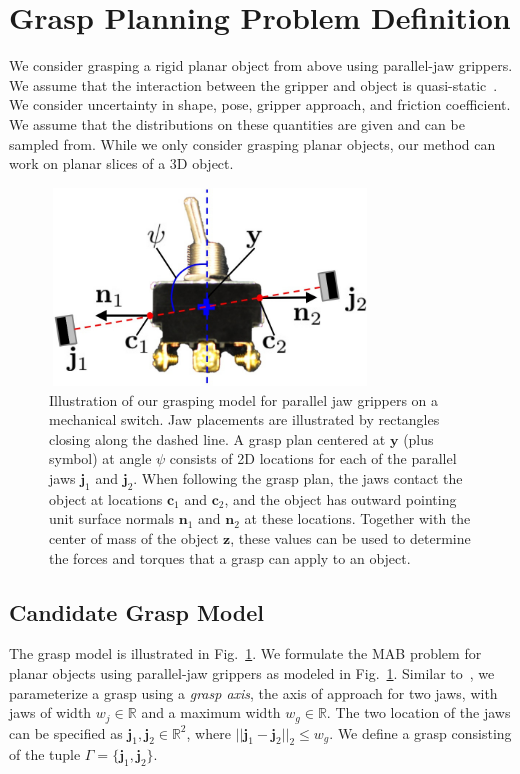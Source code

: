 \documentclass[10pt, conference]{ieeeconf}      %
\newcommand{\bc}{\mathbf{c}}
\newcommand{\bj}{\mathbf{j}}
\newcommand{\bn}{\mathbf{n}}
\newcommand{\by}{\mathbf{y}}
\newcommand{\bz}{\mathbf{z}}
\begin{document}
\section{Grasp Planning Problem Definition}
We consider grasping a rigid planar object from above using parallel-jaw grippers.
We assume that the interaction between the gripper and object is quasi-static~\cite{kehoe2012estimating, kehoe2012toward}.
We consider uncertainty in shape, pose, gripper approach, and friction coefficient. We assume that the distributions on these quantities are given and can be sampled from.  While we only consider grasping planar objects, our method can work on planar slices of a 3D object. 
\begin{figure}[t!]
\centering
\includegraphics[width = 8.5cm, height = 5.25cm]{figures/bandit_grasp_model.jpg}
\caption{Illustration of our grasping model for parallel jaw grippers on a mechanical switch. Jaw placements are
illustrated by rectangles closing along the dashed line. A grasp plan centered at $\by$ (plus symbol) at angle $\psi$ consists of 2D locations for each of the parallel jaws $\bj_1$ and $\bj_2$. When following the grasp plan, the jaws contact the object at locations $\bc_1$ and $\bc_2$, and the object has outward pointing unit surface normals $\bn_1$ and $\bn_2$ at these locations. Together with the center of mass of the object $\bz$, these values can be used to determine the forces and torques that a grasp can apply to an object.}
\vspace*{-2ex}
\label{fig:grasp_model}
\end{figure}

\subsection{Candidate Grasp Model}
The grasp model is illustrated in Fig.~\ref{fig:grasp_model}. We formulate the MAB problem for planar objects using parallel-jaw grippers as modeled in Fig.~\ref{fig:grasp_model}. Similar to~\cite{mahler2015gp}, we parameterize a grasp using a {\it grasp axis}, the axis of approach for two jaws,  with jaws of width $w_j \in \mathbb{R}$ and a maximum width $w_g \in \mathbb{R}$. The two location of the jaws can be specified as $\mathbf{j}_1,\mathbf{j}_2 \in \mathbb{R}^2$, where $||\mathbf{j}_1 - \mathbf{j}_2||_2 \leq w_g$. We define a grasp consisting of the tuple $\Gamma = \lbrace \mathbf{j}_1, \mathbf{j}_2 \rbrace$. 
\end{document}
